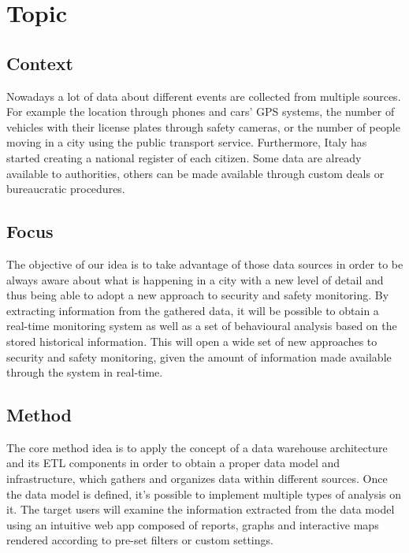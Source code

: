 \documentclass[../main.tex]{subfiles}
\begin{document}
    \chapter{Topic}\label{ch:topic}
    \section{Context}\label{sec:context}
    Nowadays a lot of data about different events are collected from multiple sources.
    For example the location through phones and cars’ GPS systems,
    the number of vehicles with their license plates through safety cameras,
    or the number of people moving in a city using the public transport service.
    Furthermore, Italy has started creating a national register of each citizen.
    Some data are already available to authorities,
    others can be made available through custom deals or bureaucratic procedures.


    \section{Focus}\label{sec:focus}
    The objective of our idea is to take advantage of those data sources in order to be always aware about what is happening in a city with a new level of detail and thus being able to adopt a new approach to security and safety monitoring. By extracting information from the gathered data, it will be possible to obtain a real-time monitoring system as well as a set of behavioural analysis based on the stored historical information. This will open a wide set of new approaches to security and safety monitoring, given the amount of information made available through the system in real-time.


    \section{Method}\label{sec:method}
    The core method idea is to apply the concept of a data warehouse architecture and its ETL components in order to obtain a proper data model and infrastructure, which gathers and organizes data within different sources.
    Once the data model is defined, it’s possible to implement multiple types of analysis on it.
    The target users will examine the information extracted from the data model using an intuitive web app composed of reports, graphs and interactive maps rendered according to pre-set filters or custom settings.
\end{document}
